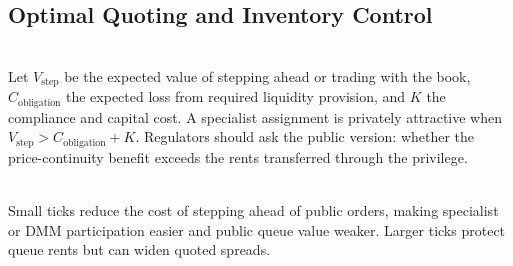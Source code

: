 \subsection{Optimal Quoting and Inventory Control}


\begin{model} \\
Let $V_{\mathrm{step}}$ be the expected value of stepping ahead or trading with the book, $C_{\mathrm{obligation}}$ the expected loss from required liquidity provision, and $K$ the compliance and capital cost. A specialist assignment is privately attractive when $V_{\mathrm{step}}>C_{\mathrm{obligation}}+K$.
Regulators should ask the public version: whether the price-continuity benefit exceeds the rents transferred through the privilege.
\end{model}

\begin{caveat} \\
Small ticks reduce the cost of stepping ahead of public orders, making specialist or DMM participation easier and public queue value weaker. Larger ticks protect queue rents but can widen quoted spreads.
\end{caveat}
